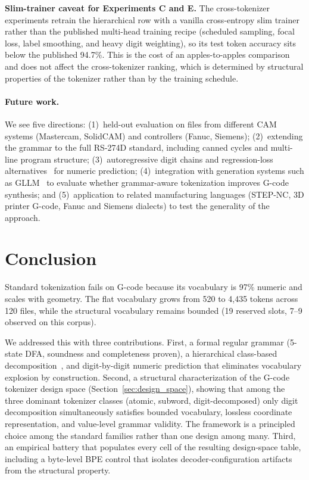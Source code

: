 \documentclass[sensors,article,submit,moreauthors,pdftex]{Definitions/mdpi}
\begin{document}
\textbf{Slim-trainer caveat for Experiments C and E.} The cross-tokenizer experiments retrain the hierarchical row with a vanilla cross-entropy slim trainer rather than the published multi-head training recipe (scheduled sampling, focal loss, label smoothing, and heavy digit weighting), so its test token accuracy sits below the published 94.7\%. This is the cost of an apples-to-apples comparison and does not affect the cross-tokenizer ranking, which is determined by structural properties of the tokenizer rather than by the training schedule.

\paragraph{Future work.}
We see five directions: (1)~held-out evaluation on files from different CAM systems (Mastercam, SolidCAM) and controllers (Fanuc, Siemens); (2)~extending the grammar to the full RS-274D standard, including canned cycles and multi-line program structure; (3)~autoregressive digit chains and regression-loss alternatives~\cite{regress_dont_guess} for numeric prediction; (4)~integration with generation systems such as GLLM~\cite{gllm} to evaluate whether grammar-aware tokenization improves G-code synthesis; and (5)~application to related manufacturing languages (STEP-NC, 3D printer G-code, Fanuc and Siemens dialects) to test the generality of the approach.

\section{Conclusion}
\label{sec:conclusion}

Standard tokenization fails on G-code because its vocabulary is 97\% numeric and scales with geometry. The flat vocabulary grows from 520 to 4{,}435 tokens across 120 files, while the structural vocabulary remains bounded (19 reserved slots, 7--9 observed on this corpus).

We addressed this with three contributions. First, a formal regular grammar (5-state DFA, soundness and completeness proven), a hierarchical class-based decomposition~\cite{brown_classlm}, and digit-by-digit numeric prediction that eliminates vocabulary explosion by construction. Second, a structural characterization of the G-code tokenizer design space (Section~\ref{sec:design_space}), showing that among the three dominant tokenizer classes (atomic, subword, digit-decomposed) only digit decomposition simultaneously satisfies bounded vocabulary, lossless coordinate representation, and value-level grammar validity. The framework is a principled choice among the standard families rather than one design among many. Third, an empirical battery that populates every cell of the resulting design-space table, including a byte-level BPE control that isolates decoder-configuration artifacts from the structural property.
\end{document}
